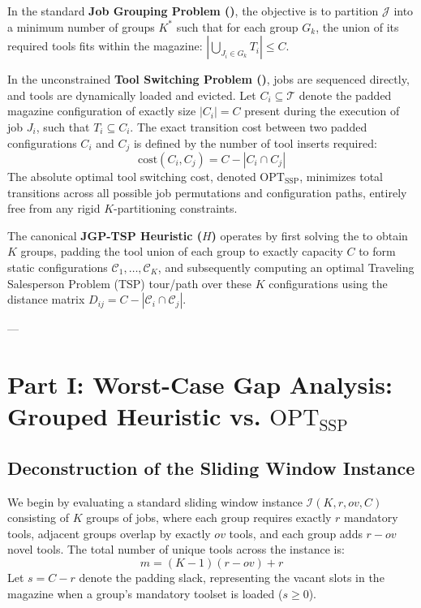 \documentclass[11pt,a4paper]{article}
\theoremstyle{plain}
\theoremstyle{definition}
\newcommand{\OPT}{\text{OPT}}
\newcommand{\JGP}{\text{JGP}}
\newcommand{\SSP}{\text{SSP}}
\begin{document}
	In the standard \textbf{Job Grouping Problem (\JGP)}, the objective is to partition $\mathcal{J}$ into a minimum number of groups $K^*$ such that for each group $G_k$, the union of its required tools fits within the magazine: $|\bigcup_{J_i \in G_k} T_i| \le C$. 
	
	In the unconstrained \textbf{Tool Switching Problem (\SSP)}, jobs are sequenced directly, and tools are dynamically loaded and evicted. Let $C_i \subseteq \mathcal{T}$ denote the padded magazine configuration of exactly size $|C_i| = C$ present during the execution of job $J_i$, such that $T_i \subseteq C_i$. The exact transition cost between two padded configurations $C_i$ and $C_j$ is defined by the number of tool inserts required:
	\begin{equation}
		\text{cost}(C_i, C_j) = C - |C_i \cap C_j|
	\end{equation}
	The absolute optimal tool switching cost, denoted $\OPT_{\SSP}$, minimizes total transitions across all possible job permutations and configuration paths, entirely free from any rigid $K$-partitioning constraints.
	
	The canonical \textbf{JGP-TSP Heuristic ($H$)} operates by first solving the \JGP{} to obtain $K$ groups, padding the tool union of each group to exactly capacity $C$ to form static configurations $\mathcal{C}_1, \dots, \mathcal{C}_K$, and subsequently computing an optimal Traveling Salesperson Problem (TSP) tour/path over these $K$ configurations using the distance matrix $D_{ij} = C - |\mathcal{C}_i \cap \mathcal{C}_j|$.
	
	---
	
	\section{Part I: Worst-Case Gap Analysis: Grouped Heuristic vs. $\OPT_{\SSP}$}
	
	\subsection{Deconstruction of the Sliding Window Instance}
	We begin by evaluating a standard sliding window instance $\mathcal{I}(K, r, ov, C)$ consisting of $K$ groups of jobs, where each group requires exactly $r$ mandatory tools, adjacent groups overlap by exactly $ov$ tools, and each group adds $r - ov$ novel tools. The total number of unique tools across the instance is:
	\begin{equation}
		m = (K-1)(r-ov) + r
	\end{equation}
	Let $s = C - r$ denote the padding slack, representing the vacant slots in the magazine when a group's mandatory toolset is loaded ($s \ge 0$). 
	
\end{document}
